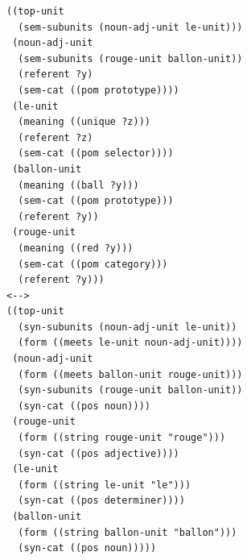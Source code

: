 \footnotesize
{}
\begin{lstlisting}
((top-unit
  (sem-subunits (noun-adj-unit le-unit)))
 (noun-adj-unit
  (sem-subunits (rouge-unit ballon-unit))
  (referent ?y)
  (sem-cat ((pom prototype))))
 (le-unit
  (meaning ((unique ?z)))
  (referent ?z)
  (sem-cat ((pom selector))))
 (ballon-unit
  (meaning ((ball ?y)))
  (sem-cat ((pom prototype)))
  (referent ?y))
 (rouge-unit
  (meaning ((red ?y)))
  (sem-cat ((pom category)))
  (referent ?y)))
<-->
((top-unit 
  (syn-subunits (noun-adj-unit le-unit))
  (form ((meets le-unit noun-adj-unit))))
 (noun-adj-unit
  (form ((meets ballon-unit rouge-unit)))
  (syn-subunits (rouge-unit ballon-unit))
  (syn-cat ((pos noun))))
 (rouge-unit
  (form ((string rouge-unit "rouge")))
  (syn-cat ((pos adjective))))
 (le-unit 
  (form ((string le-unit "le"))) 
  (syn-cat ((pos determiner))))
 (ballon-unit
  (form ((string ballon-unit "ballon")))
  (syn-cat ((pos noun)))))
\end{lstlisting}
\normalsize
